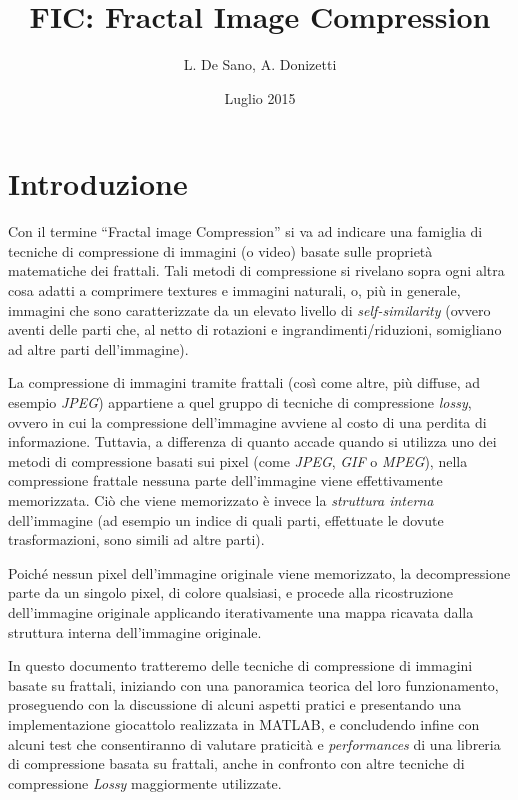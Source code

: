 \documentclass[11pt,a4paper]{scrreprt}
\author{L. De Sano, A. Donizetti}
\title{\textsc{FIC}: Fractal Image Compression}
\date{Luglio 2015}
\begin{document}
\maketitle

\tableofcontents

\chapter{Introduzione}

Con il termine ``Fractal image Compression'' si va ad indicare una famiglia di tecniche di compressione di immagini (o video) basate sulle proprietà matematiche dei frattali. Tali metodi di compressione si rivelano sopra ogni altra cosa adatti a comprimere textures e immagini naturali, o, più in generale, immagini che sono caratterizzate da un elevato livello di \emph{self-similarity} (ovvero aventi delle parti che, al netto di rotazioni e ingrandimenti/riduzioni, somigliano ad altre parti dell'immagine).

La compressione di immagini tramite frattali (così come altre, più diffuse, ad esempio \textit{JPEG}) appartiene a quel gruppo di tecniche di compressione \emph{lossy}, ovvero in cui la compressione dell'immagine avviene al costo di una perdita di informazione. Tuttavia, a differenza di quanto accade quando si utilizza uno dei metodi di compressione basati sui pixel (come \textit{JPEG}, \textit{GIF} o \textit{MPEG}), nella compressione frattale nessuna parte dell'immagine viene effettivamente memorizzata. Ciò che viene memorizzato è invece la \emph{struttura interna} dell'immagine (ad esempio un indice di quali parti, effettuate le dovute trasformazioni, sono simili ad altre parti). 

Poiché nessun pixel dell'immagine originale viene memorizzato, la decompressione parte da un singolo pixel, di colore qualsiasi, e procede alla ricostruzione dell'immagine originale applicando iterativamente una mappa ricavata dalla struttura interna dell'immagine originale.

In questo documento tratteremo delle tecniche di compressione di immagini basate su frattali, iniziando con una panoramica teorica del loro funzionamento, proseguendo con la discussione di alcuni aspetti pratici e presentando una implementazione giocattolo realizzata in MATLAB, e concludendo infine con alcuni test che consentiranno di valutare praticità e \emph{performances} di una libreria di compressione basata su frattali, anche in confronto con altre tecniche di compressione \emph{Lossy} maggiormente utilizzate.
\end{document}
